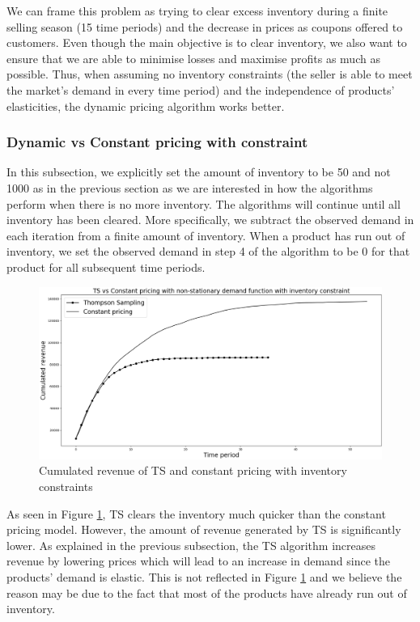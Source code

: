 \documentclass[a4paper]{article}
\begin{document}
\newline
\newline
We can frame this problem as trying to clear excess inventory during a finite selling season (15 time periods) and the decrease in prices as coupons offered to customers. Even though the main objective is to clear inventory, we also want to ensure that we are able to minimise losses and maximise profits as much as possible. Thus, when assuming no inventory constraints (the seller is able to meet the market's demand in every time period) and the independence of products' elasticities, the dynamic pricing algorithm works better.

\subsubsection{Dynamic vs Constant pricing with constraint}
In this subsection, we explicitly set the amount of inventory to be 50 and not 1000 as in the previous section as we are interested in how the algorithms perform when there is no more inventory. The algorithms will continue until all inventory has been cleared. More specifically, we subtract the observed demand in each iteration from a finite amount of inventory. When a product has run out of inventory, we set the observed demand in step 4 of the algorithm to be 0 for that product for all subsequent time periods.
\begin{figure}[h]
	\centering
	\includegraphics[width=1.03\textwidth]{4.png}
	\caption{\label{fig:five}Cumulated revenue of TS and constant pricing with inventory constraints}
\end{figure}
\newline
\newline
As seen in Figure \ref{fig:five}, TS clears the inventory much quicker than the constant pricing model. However, the amount of revenue generated by TS is significantly lower. As explained in the previous subsection, the TS algorithm increases revenue by lowering prices which will lead to an increase in demand since the products' demand is elastic. This is not reflected in Figure \ref{fig:five} and we believe the reason may be due to the fact that most of the products have already run out of inventory. 
\end{document}
